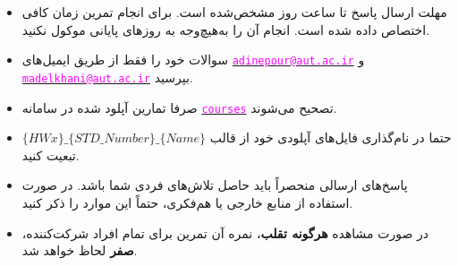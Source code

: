 \begin{itemize}
	\small
	\setlength\itemsep{0.05em}
	\item
	مهلت ارسال پاسخ تا ساعت  روز مشخص‌شده است. ﺑﺮای اﻧﺠﺎم ﺗﻤﺮﯾﻦ زﻣﺎن کافی اختصاص‌ داده ‌شده اﺳﺖ. انجام آن را به‌هیچ‌وجه ﺑﻪ روزﻫﺎی پایانی موکول نکنید.
	\item 
	سوالات خود را فقط از طریق ایمیل‌های \href{mailto:adinepour@aut.ac.ir}{\textcolor{magenta}{\texttt{adinepour@aut.ac.ir}}} و \href{mailto:madelkhani@aut.ac.ir}{\textcolor{magenta} {\texttt{madelkhani@aut.ac.ir}}} بپرسید.
	\item 
	صرفا تمارین آپلود شده در سامانه \href{https://courses.aut.ac.ir/}{\textcolor{magenta}{\texttt{courses}}} تصحیح می‌شوند.
	
	\item 
	حتما در نام‌گذاری فایل‌های آپلودی خود از قالب
	 $\{HWx\}\_\{STD\_Number\}\_\{Name\}$ 
	 تبعیت کنید.
	
	
	\item
	پاسخ‌های ارسالی منحصراً باید حاصل تلاش‌های فردی شما باشد. در صورت استفاده از منابع خارجی یا هم‌فکری، حتماً این موارد را ذکر کنید.
	
	\item 
	در صورت مشاهده \textbf{هرگونه تقلب}، نمره آن تمرین برای تمام افراد شرکت‌کننده، \textbf{صفر} لحاظ خواهد شد.
\end{itemize}